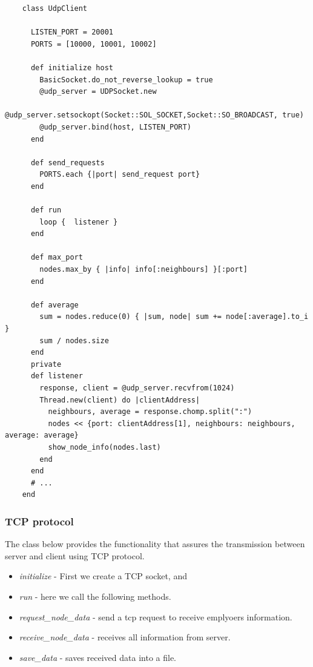 \documentclass[12pt]{article}
\begin{document}
    \begin{lstlisting}
    class UdpClient

      LISTEN_PORT = 20001
      PORTS = [10000, 10001, 10002]

      def initialize host
        BasicSocket.do_not_reverse_lookup = true
        @udp_server = UDPSocket.new
        @udp_server.setsockopt(Socket::SOL_SOCKET,Socket::SO_BROADCAST, true)
        @udp_server.bind(host, LISTEN_PORT)
      end

      def send_requests
        PORTS.each {|port| send_request port}
      end

      def run
        loop {  listener }
      end

      def max_port
        nodes.max_by { |info| info[:neighbours] }[:port]
      end

      def average
        sum = nodes.reduce(0) { |sum, node| sum += node[:average].to_i }
        sum / nodes.size
      end
      private
      def listener
        response, client = @udp_server.recvfrom(1024)
        Thread.new(client) do |clientAddress|
          neighbours, average = response.chomp.split(":")
          nodes << {port: clientAddress[1], neighbours: neighbours, average: average}
          show_node_info(nodes.last)
        end
      end
      # ...
    end
    \end{lstlisting}

    \subsubsection{TCP protocol}

    The class below provides the functionality that assures the transmission
    between server and client using TCP protocol.

    \begin{itemize}
      \renewcommand{\labelitemi}{$\circ$}
      \item \textit{initialize} - First we create a TCP socket, and
      \item \textit{run} - here we call the following methods.
      \item \textit{request\_node\_data} - send a tcp request to receive emplyoers information.
      \item \textit{receive\_node\_data} - receives all information from server.
      \item \textit{save\_data} - saves received data into a file.
    \end{itemize}
\end{document}
